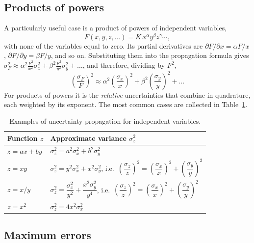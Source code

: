 \documentclass[letterpaper,11pt,leqno]{book}
\begin{document}
\subsection{Products of powers}

A particularly useful case is a product of powers of independent variables,
\begin{equation}
F(x, y, z, \dots) = K\,x^\alpha y^\beta z^\gamma \cdots,
\end{equation}
with none of the variables equal to zero. Its partial derivatives are $\partial F/\partial x = \alpha F/x$, $\partial F/\partial y = \beta F/y$, and so on. Substituting them into the propagation formula gives $\sigma_F^2 \approx \alpha^2\frac{F^2}{x^2}\sigma_x^2 + \beta^2\frac{F^2}{y^2}\sigma_y^2 + \dots$, and therefore, dividing by $F^2$,
\begin{equation}
\boxed{\left(\frac{\sigma_F}{F}\right)^2 \approx \alpha^2\left(\frac{\sigma_x}{x}\right)^2 + \beta^2\left(\frac{\sigma_y}{y}\right)^2 + \dots}
\label{eq:propagation_powers}
\end{equation}
For products of powers it is the \emph{relative} uncertainties that combine in quadrature, each weighted by its exponent. The most common cases are collected in Table~\ref{tab:propagation_examples}.

\clearpage
\begin{table}[h]
\centering
\caption{Examples of uncertainty propagation for independent variables.}
\label{tab:propagation_examples}
\begin{tabular*}{\textwidth}{l@{\extracolsep\fill}l}
\toprule
Function $z$ & Approximate variance $\sigma_z^2$ \\
\midrule
$z = ax + by$ & $\sigma_z^2 = a^2\sigma_x^2 + b^2\sigma_y^2$ \\[1ex]
$z = xy$ & $\sigma_z^2 = y^2\sigma_x^2 + x^2\sigma_y^2$, \quad i.e.\ $\left(\dfrac{\sigma_z}{z}\right)^2 = \left(\dfrac{\sigma_x}{x}\right)^2 + \left(\dfrac{\sigma_y}{y}\right)^2$ \\[2ex]
$z = x/y$ & $\sigma_z^2 = \dfrac{\sigma_x^2}{y^2} + \dfrac{x^2\sigma_y^2}{y^4}$, \quad i.e.\ $\left(\dfrac{\sigma_z}{z}\right)^2 = \left(\dfrac{\sigma_x}{x}\right)^2 + \left(\dfrac{\sigma_y}{y}\right)^2$ \\[2ex]
$z = x^2$ & $\sigma_z^2 = 4x^2\sigma_x^2$ \\
\bottomrule
\end{tabular*}
\end{table}

\subsection{Maximum errors}
\end{document}
